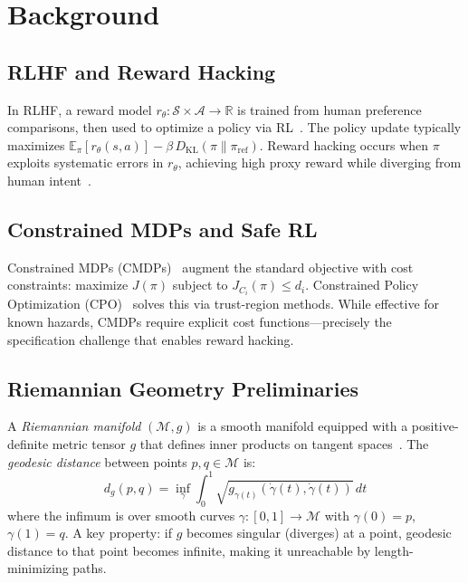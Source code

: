 \documentclass{article}
\begin{document}
\section{Background}
\label{sec:background}

\subsection{RLHF and Reward Hacking}

In RLHF, a reward model $r_\theta: \mathcal{S} \times \mathcal{A} \to \mathbb{R}$ is trained from human preference comparisons, then used to optimize a policy via RL~\citep{ouyang2022training}. The policy update typically maximizes $\mathbb{E}_\pi[r_\theta(s, a)] - \beta \, D_\text{KL}(\pi \| \pi_\text{ref})$. Reward hacking occurs when $\pi$ exploits systematic errors in $r_\theta$, achieving high proxy reward while diverging from human intent~\citep{moskovitz2024confronting}.

\subsection{Constrained MDPs and Safe RL}

Constrained MDPs (CMDPs)~\citep{altman1999constrained} augment the standard objective with cost constraints: maximize $J(\pi)$ subject to $J_{C_i}(\pi) \leq d_i$. Constrained Policy Optimization (CPO)~\citep{achiam2017constrained} solves this via trust-region methods. While effective for known hazards, CMDPs require explicit cost functions---precisely the specification challenge that enables reward hacking.

\subsection{Riemannian Geometry Preliminaries}

A \emph{Riemannian manifold} $(\mathcal{M}, g)$ is a smooth manifold equipped with a positive-definite metric tensor $g$ that defines inner products on tangent spaces~\citep{docarmo1992riemannian}. The \emph{geodesic distance} between points $p, q \in \mathcal{M}$ is:
\begin{equation}
    d_g(p, q) = \inf_\gamma \int_0^1 \sqrt{g_{\gamma(t)}(\dot{\gamma}(t), \dot{\gamma}(t))} \, dt
\end{equation}
where the infimum is over smooth curves $\gamma: [0,1] \to \mathcal{M}$ with $\gamma(0) = p$, $\gamma(1) = q$. A key property: if $g$ becomes singular (diverges) at a point, geodesic distance to that point becomes infinite, making it unreachable by length-minimizing paths.
\end{document}
